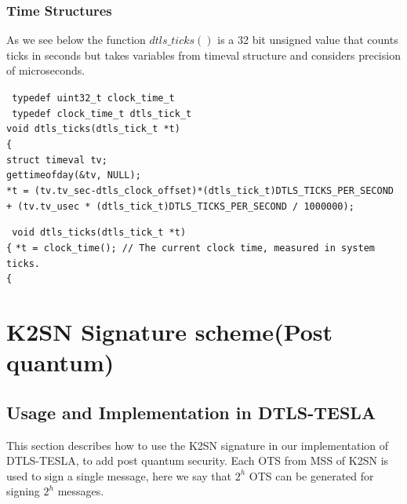 \subsubsection{Time Structures}

As we see below the function $dtls\_ticks()$ is a 32 bit unsigned value that counts ticks in seconds but takes variables from timeval structure and considers precision of microseconds.


\indent \texttt{ typedef uint32\_t 	clock\_time\_t}\\
\indent \texttt{ typedef clock\_time\_t 	dtls\_tick\_t}\\



\indent \texttt{void dtls\_ticks(dtls\_tick\_t *t)}\\
\indent \texttt{\{}\\
\indent \texttt{struct timeval tv;}\\
\indent \texttt{gettimeofday(\&tv, NULL);}\\
  
\indent \texttt{*t = (tv.tv\_sec-dtls\_clock\_offset)*(dtls\_tick\_t)DTLS\_TICKS\_PER\_SECOND  +  (tv.tv\_usec * (dtls\_tick\_t)DTLS\_TICKS\_PER\_SECOND / 1000000);}




\indent \texttt{ void dtls\_ticks(dtls\_tick\_t *t)}\\
\indent \texttt{\{}
 \indent \texttt{*t = clock\_time();    // The current clock time, measured in system ticks.}\\
 \indent \texttt{\{}









\section{K2SN Signature scheme(Post quantum)}

\subsection{Usage and Implementation in DTLS-TESLA}
This section describes how to use the K2SN signature in our implementation of DTLS-TESLA, to add post quantum security.
Each OTS from MSS of K2SN is used to sign a single message, here we say that $2^{h}$ OTS can be generated for signing $2^{h}$ messages.

